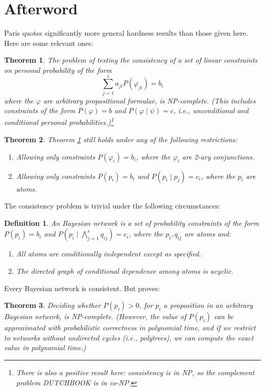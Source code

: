 \documentclass[letterpaper,12pt]{article}
\renewcommand{\phi}{\varphi}
\newtheorem{definition}{Definition}
\newtheorem{theorem}{Theorem}
\begin{document}
\section{Afterword}
Paris quotes significantly more general hardness results than those given here. Here are some relevant ones:
\begin{theorem}
\label{linearConstraintsNPComplete}
The problem of testing the consistency of a set of linear constraints on personal probability of the form
$$\sum_{j=1}^r a_{ji} P(\phi_{ji}) = b_i$$
where the $\phi$ are arbitrary propositional formulae, is NP-complete. (This includes constraints of the form $P(\phi) = b$ and $P(\phi \mid \psi) = c$, i.e., unconditional and conditional personal probabilities.)\footnote{There is also a positive result here: consistency is in NP, so the complement problem DUTCHBOOK is in co-NP.}
\end{theorem}
\begin{theorem}
\label{simpleConstraintsNPHard}
Theorem \ref{linearConstraintsNPComplete} still holds under any of the following restrictions:
\begin{enumerate}
\item
Allowing only constraints $P(\phi_i) = b_i$, where the $\phi_i$ are 2-ary conjunctions.
\item
Allowing only constraints $P(p_i) = b_i$ and $P(p_i \mid p_j) = c_i$, where the $p_i$ are atoms.
\end{enumerate}
\end{theorem}
The consistency problem is trivial under the following circumstances:
\begin{definition}
An \emph{Bayesian network} is a set of probability constraints of the form $P(p_i) = b_i$ and $P(p_i \mid \bigwedge_{j=1}^r q_{ij}) = c_i$, where the $p_i, q_{ij}$ are atoms and:
\begin{enumerate}
\item
All atoms are conditionally independent except as specified.
\item
The directed graph of conditional dependence among atoms is acyclic.
\end{enumerate}
\end{definition}
Every Bayesian network is consistent. But \cite{Cooper:1990:CCP:77754.77762} proves:

\begin{theorem}
\label{bayesNetNPHard}
Deciding whether $P(p_i) > 0$, for $p_i$ a proposition in an arbitrary Bayesian network, is NP-complete. (However, the value of $P(p_i)$ can be approximated with probabilistic correctness in polynomial time, and if we restrict to networks without \emph{undirected} cycles (i.e., polytrees), we can compute the exact value in polynomial time.)
\end{theorem}
\end{document}
